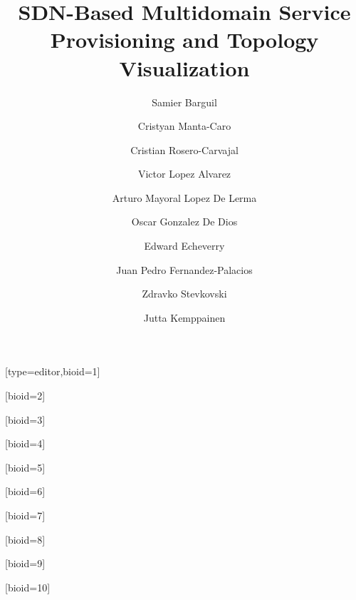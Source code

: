 \documentclass[a4paper,fleqn]{cas-dc}
\begin{document}
\let\WriteBookmarks\relax
\def\floatpagepagefraction{1}
\def\textpagefraction{.001}

\title [mode = title]{SDN-Based Multidomain Service Provisioning and Topology Visualization}                      



\author[1]{Samier Barguil}[type=editor,bioid=1]
\cormark[1]

\author[4]{Cristyan Manta-Caro}[bioid=2]

\author[4]{Cristian Rosero-Carvajal}[bioid=3]

\author[2]{Victor Lopez Alvarez}[bioid=4]

\author[2]{Arturo Mayoral Lopez De Lerma}[bioid=5]

\author[2]{Oscar Gonzalez De Dios}[bioid=6]

\author[3]{Edward Echeverry}[bioid=7]

\author[2]{Juan Pedro Fernandez-Palacios}[bioid=8]

\author[5]{Zdravko Stevkovski}[bioid=9]

\author[5]{Jutta Kemppainen}[bioid=10]


\address[1]{Universidad Autonoma de Madrid, Madrid, Spain}
\address[2]{Telefonica I+D, Ronda de la Comunicacion, Madrid, Spain}
\address[3]{Telefonica Movistar, Transversal 60 No 114ª -55. Bogotá, Colombia}
\address[4]{Wipro Technologies Ltd., Doddakannelli, Sarjapur Road
Bengaluru - 560 035, India}
\address[5]{Infinera Corporation, 140 Caspian Court, Sunnyvale, CA 94089, USA}


\end{document}
